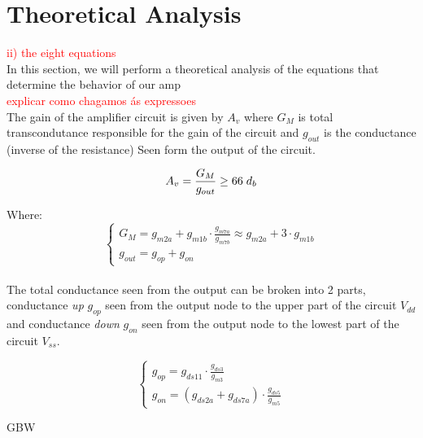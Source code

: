 \section{Theoretical Analysis}

\textcolor{red}{ii) the eight equations}\\

In this section, we will perform a theoretical analysis of the equations that determine the behavior of our amp\\

\textcolor{red}{explicar como chagamos ás expressoes}\\

The gain of the amplifier circuit is given by $A_v$ where $G_M$ is total transcondutance responsible for the gain of the circuit and $g_{out}$ is the conductance (inverse of the resistance) Seen form the output of the circuit.

$$A_v =  \frac{G_M}{g_{out}} \geq 66\hspace{0.1cm}d_b\\[0.125cm]$$

Where:
\begin{equation}
    \begin{cases}
        G_M = g_{m2a} + g_{m1b} \cdot \frac{g_{m7a}}{g_{m7b}} \approx g_{m2a} + 3 \cdot g_{m1b} \\
        g_{out} = g_{op} + g_{on}
    \end{cases}
\end{equation}\\

The total conductance seen from the output can be broken into 2 parts, conductance \textit{up} $g_{op}$ seen from the output node to the upper part of the circuit $V_{dd}$ and conductance \textit{down} $g_{on}$ seen from the output node to the lowest part of the circuit $V_{ss}$.

\begin{equation}
    \begin{cases}
        g_{op} = g_{ds11} \cdot \frac{g_{ds3}}{g_{m3}} \\
        g_{on} = \left( g_{ds2a} + g_{ds7a} \right) \cdot \frac{g_{ds5}}{g_{m5}}
    \end{cases}
\end{equation}

\newpage

GBW



